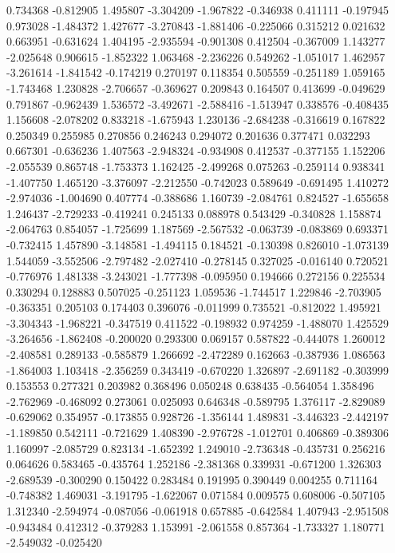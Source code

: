 0.734368
-0.812905
1.495807
-3.304209
-1.967822
-0.346938
0.411111
-0.197945
0.973028
-1.484372
1.427677
-3.270843
-1.881406
-0.225066
0.315212
0.021632
0.663951
-0.631624
1.404195
-2.935594
-0.901308
0.412504
-0.367009
1.143277
-2.025648
0.906615
-1.852322
1.063468
-2.236226
0.549262
-1.051017
1.462957
-3.261614
-1.841542
-0.174219
0.270197
0.118354
0.505559
-0.251189
1.059165
-1.743468
1.230828
-2.706657
-0.369627
0.209843
0.164507
0.413699
-0.049629
0.791867
-0.962439
1.536572
-3.492671
-2.588416
-1.513947
0.338576
-0.408435
1.156608
-2.078202
0.833218
-1.675943
1.230136
-2.684238
-0.316619
0.167822
0.250349
0.255985
0.270856
0.246243
0.294072
0.201636
0.377471
0.032293
0.667301
-0.636236
1.407563
-2.948324
-0.934908
0.412537
-0.377155
1.152206
-2.055539
0.865748
-1.753373
1.162425
-2.499268
0.075263
-0.259114
0.938341
-1.407750
1.465120
-3.376097
-2.212550
-0.742023
0.589649
-0.691495
1.410272
-2.974036
-1.004690
0.407774
-0.388686
1.160739
-2.084761
0.824527
-1.655658
1.246437
-2.729233
-0.419241
0.245133
0.088978
0.543429
-0.340828
1.158874
-2.064763
0.854057
-1.725699
1.187569
-2.567532
-0.063739
-0.083869
0.693371
-0.732415
1.457890
-3.148581
-1.494115
0.184521
-0.130398
0.826010
-1.073139
1.544059
-3.552506
-2.797482
-2.027410
-0.278145
0.327025
-0.016140
0.720521
-0.776976
1.481338
-3.243021
-1.777398
-0.095950
0.194666
0.272156
0.225534
0.330294
0.128883
0.507025
-0.251123
1.059536
-1.744517
1.229846
-2.703905
-0.363351
0.205103
0.174403
0.396076
-0.011999
0.735521
-0.812022
1.495921
-3.304343
-1.968221
-0.347519
0.411522
-0.198932
0.974259
-1.488070
1.425529
-3.264656
-1.862408
-0.200020
0.293300
0.069157
0.587822
-0.444078
1.260012
-2.408581
0.289133
-0.585879
1.266692
-2.472289
0.162663
-0.387936
1.086563
-1.864003
1.103418
-2.356259
0.343419
-0.670220
1.326897
-2.691182
-0.303999
0.153553
0.277321
0.203982
0.368496
0.050248
0.638435
-0.564054
1.358496
-2.762969
-0.468092
0.273061
0.025093
0.646348
-0.589795
1.376117
-2.829089
-0.629062
0.354957
-0.173855
0.928726
-1.356144
1.489831
-3.446323
-2.442197
-1.189850
0.542111
-0.721629
1.408390
-2.976728
-1.012701
0.406869
-0.389306
1.160997
-2.085729
0.823134
-1.652392
1.249010
-2.736348
-0.435731
0.256216
0.064626
0.583465
-0.435764
1.252186
-2.381368
0.339931
-0.671200
1.326303
-2.689539
-0.300290
0.150422
0.283484
0.191995
0.390449
0.004255
0.711164
-0.748382
1.469031
-3.191795
-1.622067
0.071584
0.009575
0.608006
-0.507105
1.312340
-2.594974
-0.087056
-0.061918
0.657885
-0.642584
1.407943
-2.951508
-0.943484
0.412312
-0.379283
1.153991
-2.061558
0.857364
-1.733327
1.180771
-2.549032
-0.025420
